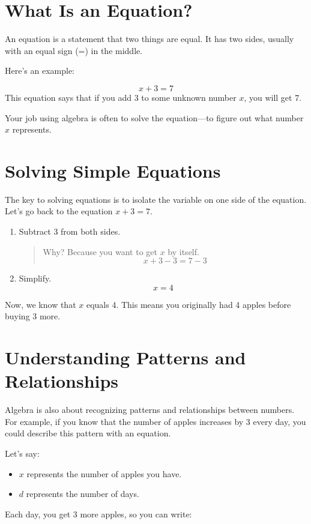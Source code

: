\section{What Is an Equation?}
An equation is a statement that two things are equal. It has two sides, usually with an equal sign (=) in the middle.

Here’s an example:

\[ x + 3 = 7 \]
This equation says that if you add 3 to some unknown number $x$, you will get 7.

Your job using algebra is often to solve the equation—to figure out what number $x$ represents.

\section{Solving Simple Equations}
The key to solving equations is to isolate the variable on one side of the equation. Let’s go back to the equation $x + 3 = 7$.

\begin{enumerate}
    \item Subtract 3 from both sides.
    \begin{quote}
    Why? Because you want to get $x$ by itself.
    \[ x + 3 - 3 = 7 - 3 \]
    \end{quote}
    \item Simplify.
    \[ x = 4 \]
\end{enumerate}

Now, we know that $x$ equals 4. This means you originally had 4 apples before buying 3 more.

\section{Understanding Patterns and Relationships}
Algebra is also about recognizing patterns and relationships between numbers. For example, if you know that the number of apples increases by 3 every day, you could describe this pattern with an equation.

Let’s say:

\begin{itemize}
    \item $x$ represents the number of apples you have.
    \item $d$ represents the number of days.
\end{itemize}

Each day, you get 3 more apples, so you can write:

